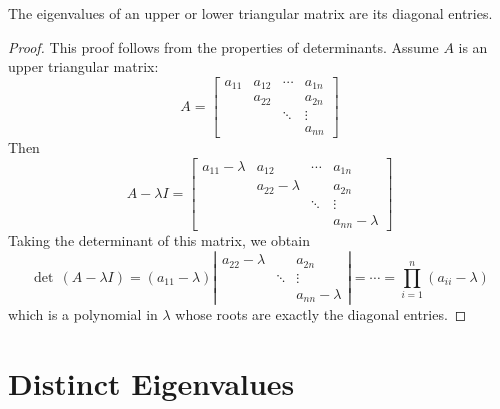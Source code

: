 \begin{prop}
The eigenvalues of an upper or lower triangular matrix are its diagonal entries.
\end{prop}
\begin{proof}
This proof follows from the properties of determinants. Assume $A$ is an upper triangular matrix: \[ A = \left[ \begin{array}{cccc} a_{11} & a_{12} & \cdots  & a_{1n} \\  & a_{22} &  & a_{2n} \\  & & \ddots & \vdots \\  & & & a_{nn} \end{array} \right] \] Then \[ A-\lambda I = \left[ \begin{array}{cccc} a_{11}-\lambda & a_{12} & \cdots  & a_{1n} \\  & a_{22}-\lambda &  & a_{2n} \\  & & \ddots & \vdots \\  & & & a_{nn}-\lambda \end{array} \right] \] Taking the determinant of this matrix, we obtain
\[ \det\, \left(A-\lambda I \right) = \left(a_{11}-\lambda\right) \left| \begin{array}{ccc}  a_{22}-\lambda &  & a_{2n} \\  & \ddots & \vdots \\  & & a_{nn}-\lambda \end{array}  \right| = \cdots = \prod_{i=1}^n \left(a_{ii}-\lambda\right) \] which is a polynomial in $\lambda$ whose roots are exactly the diagonal entries.
\end{proof}



\section{Distinct Eigenvalues}

